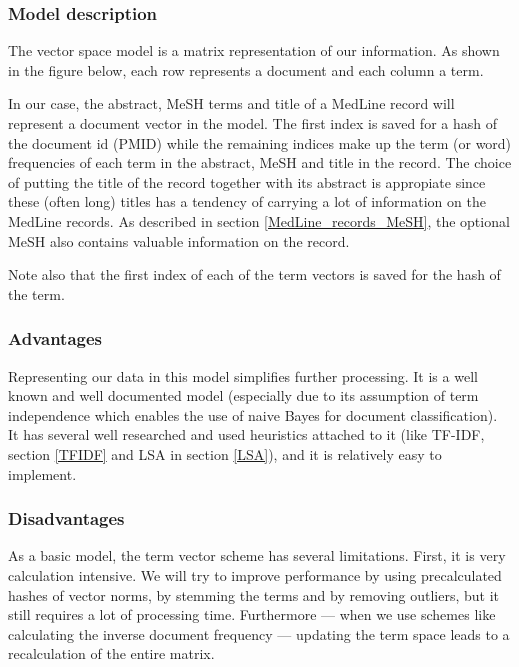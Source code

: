 \subsubsection{Model description}
The vector space model is a matrix representation of our
information. As shown in the figure below, each row represents a
document and each column a term.


In our case, the abstract, MeSH terms and title of a MedLine record
will represent a document vector in the model. The first index is
saved for a hash of the document id (PMID)  while the remaining indices make up the term (or word)
frequencies of each term in the abstract, MeSH and title in the
record. The choice of putting the title of the record together with
its abstract is appropiate since these (often long) titles has a
tendency of carrying a lot of information on the MedLine records. As
described in section \ref{MedLine_records_MeSH}, the optional MeSH
also contains valuable information on the record.

Note also that the first index of each of the term vectors is saved
for the hash of the term.

\subsubsection{Advantages}
Representing our data in this model simplifies further
processing. It is a well known and well documented model (especially
due to its assumption of term independence which enables the use of naive
Bayes for document classification). It has several well researched and
used heuristics attached to it (like TF-IDF, section \ref{TFIDF} and LSA
 in section \ref{LSA}), and it is relatively easy to implement.

\subsubsection{Disadvantages}
As a basic model, the term vector scheme has several
limitations. First, it is very calculation intensive. We will try to
improve performance by using precalculated hashes of vector norms, by
stemming the terms and by removing outliers, but it still requires a
lot of processing time. Furthermore --- when we use schemes like
calculating the inverse document frequency --- updating the term space
leads to a recalculation of the entire matrix.


